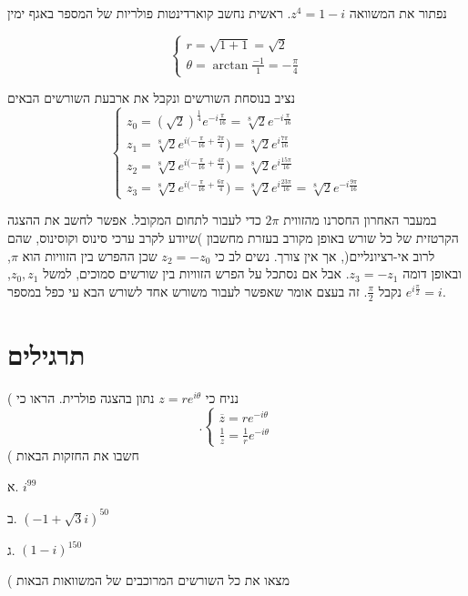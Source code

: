 \documentclass[
  hebrew,
  12pt,
  a4paper,
  oneside]{book}
\theoremstyle{definition}
\theoremstyle{remark}
\theoremstyle{plain}
\theoremstyle{remark}
\begin{document}
\begin{example}

נפתור את המשוואה \(z^{4}=1-i\). ראשית נחשב קוארדינטות פולריות של המספר
באגף ימין

\[\begin{cases}
r=\sqrt{1+1}=\sqrt{2}\\
\theta=\arctan\frac{-1}{1}=-\frac{\pi}{4}
\end{cases}\]

נציב בנוסחת השורשים ונקבל את ארבעת השורשים הבאים \[\begin{cases}
z_{0}=(\sqrt{2})^{\frac{1}{4}}e^{-i\frac{\pi}{16}}=\sqrt[8]{2}e^{-i\frac{\pi}{16}}\\
z_{1}=\sqrt[8]{2}e^{i(-\frac{\pi}{16}+\frac{2\pi}{4}})=\sqrt[8]{2}e^{i\frac{7\pi}{16}}\\
z_{2}=\sqrt[8]{2}e^{i(-\frac{\pi}{16}+\frac{4\pi}{4}})=\sqrt[8]{2}e^{i\frac{15\pi}{16}}\\
z_{3}=\sqrt[8]{2}e^{i(-\frac{\pi}{16}+\frac{6\pi}{4}})=\sqrt[8]{2}e^{i\frac{23\pi}{16}}=\sqrt[8]{2}e^{-i\frac{9\pi}{16}}
\end{cases}\]

במעבר האחרון החסרנו מהזווית \(2\pi\) כדי לעבור לתחום המקובל. אפשר לחשב
את ההצגה הקרטזית של כל שורש באופן מקורב בעזרת מחשבון )שיודע לקרב ערכי
סינוס וקוסינוס, שהם לרוב אי-רציונליים(, אך אין צורך. נשים לב כי
\(z_{2}=-z_{0}\) שכן ההפרש בין הזוויות הוא \(\pi\), ובאופן דומה
\(z_{3}=-z_{1}\). אבל אם נסתכל על הפרש הזוויות בין שורשים סמוכים, למשל
\(z_{0},z_{1}\), נקבל \(\frac{\pi}{2}\). זה בעצם אומר שאפשר לעבור משורש
אחד לשורש הבא עי כפל במספר \(e^{i\frac{\pi}{2}}=i\).

\end{example}

\section{תרגילים}\label{ux5eaux5e8ux5d2ux5d9ux5dcux5d9ux5dd-1}

( נניח כי \(z=re^{i\theta}\) נתון בהצגה פולרית. הראו כי \[.\begin{cases}
        \overline{z}=re^{-i\theta}\\
        \frac{1}{z}=\frac{1}{r}e^{-i\theta}
    \end{cases}\] ( חשבו את החזקות הבאות

א. \(i^{99}\)

ב. \((-1+\sqrt{3}i)^{50}\)

ג. \((1-i)^{150}\)

( מצאו את כל השורשים המרוכבים של המשוואות הבאות
\end{document}
